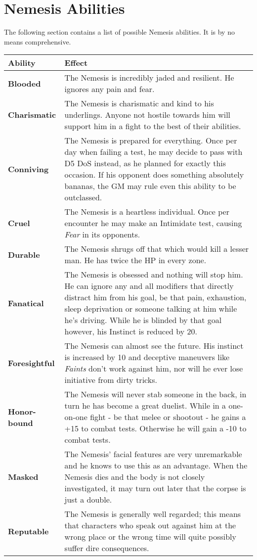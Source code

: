 \documentclass[12pt,a4paper,openany,usenames,dvipsnames]{book}
\begin{document}
	\section*{Nemesis Abilities}
	The following section contains a list of possible Nemesis abilities. It is by no means comprehensive.\\
	{\setlength{\extrarowheight}{5pt}
	\begin{tabularx}{\textwidth}{l|X}
		Ability & Effect\\
		\hline
		\textbf{Blooded} & The Nemesis is incredibly jaded and resilient. He ignores any pain and fear.\\
		\hline
		\textbf{Charismatic} & The Nemesis is charismatic and kind to his underlings. Anyone not hostile towards him will support him in a fight to the best of their abilities.\\
		\hline
		\textbf{Conniving} & The Nemesis is prepared for everything. Once per day when failing a test, he may decide to pass with D5 DoS instead, as he planned for exactly this occasion. If his opponent does something absolutely bananas, the GM may rule even this ability to be outclassed.\\
		\hline
		\textbf{Cruel} & The Nemesis is a heartless individual. Once per encounter he may make an Intimidate test, causing \emph{Fear} in its opponents.\\
		\hline
		\textbf{Durable} & The Nemesis shrugs off that which would kill a lesser man. He has twice the HP in every zone.\\
		\hline
		\textbf{Fanatical} & The Nemesis is obsessed and nothing will stop him. He can ignore any and all modifiers that directly distract him from his goal, be that pain, exhaustion, sleep deprivation or someone talking at him while he's driving. While he is blinded by that goal however, his Instinct is reduced by 20.\\
		\hline
		\textbf{Foresightful} & The Nemesis can almost see the future. His instinct is increased by 10 and deceptive maneuvers like \emph{Faints} don't work against him, nor will he ever lose initiative from dirty tricks.\\
		\hline
		\textbf{Honor-bound} & The Nemesis will never stab someone in the back, in turn he has become a great duelist. While in a one-on-one fight - be that melee or shootout - he gains a +15 to combat tests. Otherwise he will gain a -10 to combat tests.\\
		\hline
		\textbf{Masked} & The Nemesis' facial features are very unremarkable and he knows to use this as an advantage. When the Nemesis dies and the body is not closely investigated, it may turn out later that the corpse is just a double.\\
		\hline
		\textbf{Reputable} & The Nemesis is generally well regarded; this means that characters who speak out against him at the wrong place or the wrong time will quite possibly suffer dire consequences.
	\end{tabularx}}
	
\end{document}
